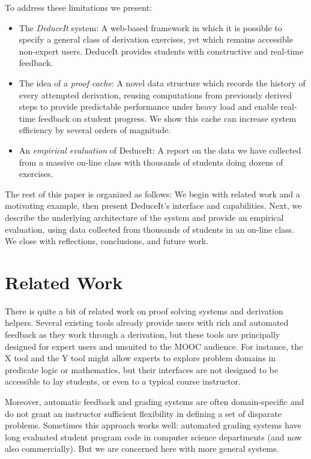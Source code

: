 \documentclass{sigchi}
\begin{document}
To address these limitations we present:
\begin{itemize}
\item The \textit{DeduceIt} system: A web-based framework in which it is possible to specify a general class of derivation exercises, yet which remains accessible non-expert users. DeduceIt provides students with constructive and real-time feedback.
\item The idea of a \textit{proof cache}: A novel data structure which records the history of every attempted derivation, reusing computations from previously derived steps to provide predictable performance under heavy load and enable real-time feedback on student progress. We show this cache can increase system efficiency by several orders of magnitude.
\item An \textit{empirical evaluation} of DeduceIt: A report on the data we have collected from a massive on-line class with thousands of students doing dozens of exercises.
\end{itemize}

The rest of this paper is organized as follows: We begin with related work and a motivating example, then present DeduceIt's interface and capabilities. Next, we describe the underlying architecture of the system and provide an empirical evaluation, using data collected from thousands of students in an on-line class. We close with reflections, conclusions, and future work.

\section{Related Work}
There is quite a bit of related work on proof solving systems and derivation helpers. Several existing tools already provide users with rich and automated feedback as they work through a derivation, but these tools are principally designed for expert users and unsuited to the MOOC audience. For instance, the X tool and the Y tool might allow experts to explore problem domains in predicate logic or mathematics, but their interfaces are not designed to be accessible to lay students, or even to a typical course instructor. 

Moreover, automatic feedback and grading systems are often domain-specific and do not grant an instructor sufficient flexibility in defining a set of disparate problems. Sometimes this approach works well: automated grading systems have long evaluated student program code in computer science departments (and now also commercially). But we are concerned here with more general systems.
\end{document}
